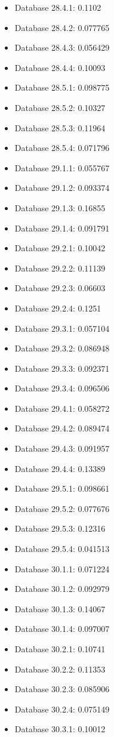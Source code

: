 \begin{itemize}
\item Database 28.4.1: 0.1102
\item Database 28.4.2: 0.077765
\item Database 28.4.3: 0.056429
\item Database 28.4.4: 0.10093
\item Database 28.5.1: 0.098775
\item Database 28.5.2: 0.10327
\item Database 28.5.3: 0.11964
\item Database 28.5.4: 0.071796
\item Database 29.1.1: 0.055767
\item Database 29.1.2: 0.093374
\item Database 29.1.3: 0.16855
\item Database 29.1.4: 0.091791
\item Database 29.2.1: 0.10042
\item Database 29.2.2: 0.11139
\item Database 29.2.3: 0.06603
\item Database 29.2.4: 0.1251
\item Database 29.3.1: 0.057104
\item Database 29.3.2: 0.086948
\item Database 29.3.3: 0.092371
\item Database 29.3.4: 0.096506
\item Database 29.4.1: 0.058272
\item Database 29.4.2: 0.089474
\item Database 29.4.3: 0.091957
\item Database 29.4.4: 0.13389
\item Database 29.5.1: 0.098661
\item Database 29.5.2: 0.077676
\item Database 29.5.3: 0.12316
\item Database 29.5.4: 0.041513
\item Database 30.1.1: 0.071224
\item Database 30.1.2: 0.092979
\item Database 30.1.3: 0.14067
\item Database 30.1.4: 0.097007
\item Database 30.2.1: 0.10741
\item Database 30.2.2: 0.11353
\item Database 30.2.3: 0.085906
\item Database 30.2.4: 0.075149
\item Database 30.3.1: 0.10012

\end{itemize}
